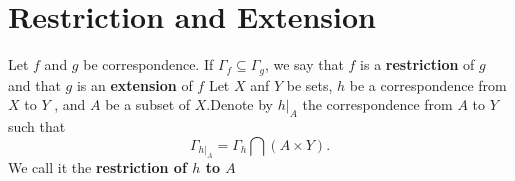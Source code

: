 \section{Restriction and Extension}
\begin{definitionenv}
    Let $f$ and $g$ be correspondence. If $\Gamma _f\subseteq \Gamma _g$,  we say that $f$ is a \textbf{restriction} of $g$ and that $g$ is an \textbf{extension} of $f$
    \newline
    Let $X$ anf $Y$ be sets,  $h$ be a correspondence from $X$ to $Y$ , and $A$ be a subset of $X$.Denote by $h|_A$ the correspondence from $A$ to $Y$ such that$$\Gamma_{h|_A}=\Gamma_h\bigcap (A\times Y).$$ We call it the \textbf{restriction of $h$ to $A$}
\end{definitionenv}